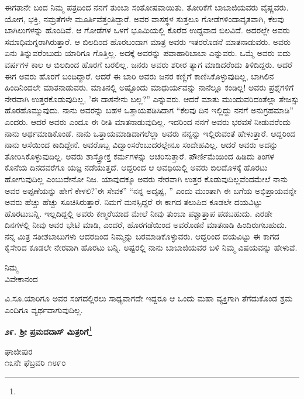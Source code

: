 ಈಗತಾನೇ ಬಂದ ನಿಮ್ಮ ಪತ್ರದಿಂದ ನನಗೆ ತುಂಬಾ ಸಂತೋಷವಾಯಿತು. ತೋರಿಕೆಗೆ ಬಾಬಾಜಿಯವರು ವೈಷ್ಣವರು. ಯೋಗ, ಭಕ್ತಿ, ನಮ್ರತೆಗಳೇ ಮೂರ್ತಿವೆತ್ತಂತಿದ್ದಾರೆ. ಅವರ ವಾಸಸ್ಥಳ ಸುತ್ತಲೂ ಗೋಡೆಗಳಿಂದಾವೃತವಾಗಿ, ಕೆಲವು ಬಾಗಿಲುಗಳನ್ನು ಹೊಂದಿವೆ. ಆ ಗೋಡೆಗಳ ಒಳಗೆ ಭೂಮಿಯಲ್ಲಿ ಕೊರೆದ ಉದ್ದವಾದ ಬಿಲವಿದೆ. ಅದರಲ್ಲೇ ಅವರು ಸಮಾಧಿಮಗ್ನರಾಗಿರುತ್ತಾರೆ. ಆ ಬಿಲದಿಂದ ಹೊರಬಂದಾಗ ಮಾತ್ರ ಅವರು ಇತರರೊಡನೆ ಮಾತನಾಡುವರು. ಅವರು ಏನು ತಿನ್ನುವರೆಂಬುದು ಯಾರಿಗೂ ಗೊತ್ತಿಲ್ಲ. ಅದಕ್ಕೆ ಅವರನ್ನು ಪವಾಹಾರಿಬಾಬಾ ಎನ್ನುವರು. ಒಮ್ಮೆ ಅವರು ಐದು ವರ್ಷಗಳ ಕಾಲ ಆ ಬಿಲದಿಂದ ಹೊರಗೆ ಬರಲಿಲ್ಲ. ಜನರು ಅವರು ಶರೀರ ತ್ಯಾಗ ಮಾಡಿದರೆಂದು ತಿಳಿದಿದ್ದರು. ಆದರೆ ಈಗ ಅವರು ಹೊರಗೆ ಬಂದಿದ್ದಾರೆ. ಆದರೆ ಈ ಬಾರಿ ಅವರು ಜನರ ಕಣ್ಣಿಗೆ ಕಾಣಿಸಿಕೊಳ್ಳುವುದಿಲ್ಲ, ಬಾಗಿಲಿನ ಹಿಂದಿನಿಂದಲೇ ಮಾತನಾಡುವರು. ಮಾತಿನಲ್ಲಿ ಅಷ್ಟೊಂದು ಮಾಧುರ್ಯವನ್ನು ನಾನೆಲ್ಲೂ ಕಂಡಿಲ್ಲ! ಅವರು ಪ್ರಶ್ನೆಗಳಿಗೆ ನೇರವಾಗಿ ಉತ್ತರಕೊಡುವುದಿಲ್ಲ, ’ಈ ದಾಸನೇನು ಬಲ್ಲ?” ಎನ್ನುವರು. ಆದರೆ ಮಾತು ಮುಂದುವರಿದಂತೆಲ್ಲಾ ತೇಜಸ್ಸು ಹೊರಹೊಮ್ಮುವುದು. ನಾನು ಅವರನ್ನು ಬಹಳ ಒತ್ತಾಯಪಡಿಸಿದಾಗ “ಕೆಲವು ದಿನ ಇಲ್ಲಿದ್ದು ನನಗೆ ಅನುಗ್ರಹಮಾಡಿ” ಎಂದರು. ಆದರೆ ಅವರು ಎಂದೂ ಈ ರೀತಿ ಮಾತನಾಡುವುದಿಲ್ಲ. ಇದರಿಂದ ನನಗೆ ಅವರು ಭರವಸೆ ನೀಡುವರೆಂದು ನಾನು ಅರ್ಥಮಾಡಿಕೊಂಡೆ. ನಾನು ಒತ್ತಾಯಮಾಡಿದಾಗಲೆಲ್ಲಾ ಅವರು ನನ್ನನ್ನು ಇಲ್ಲಿರುವಂತೆ ಹೇಳುತ್ತಾರೆ. ಆದ್ದರಿಂದ ನಾನು ಆಸೆಯಿಂದ ಕಾದಿದ್ದೇನೆ. ಅವರೊಬ್ಬ ವಿದ್ವಾಂಸರೆಂಬುದರಲ್ಲೇನೂ ಸಂದೇಹವಿಲ್ಲ. ಆದರೆ ಅವರು ಅದನ್ನು ತೋರಿಸಿಕೊಳ್ಳುವುದಿಲ್ಲ. ಅವರು ಶಾಸ್ತ್ರೋಕ್ತ ಕರ್ಮಗಳನ್ನು ಆಚರಿಸುತ್ತಾರೆ. ಪೌರ್ಣಿಮೆಯಿಂದ ಹಿಡಿದು ತಿಂಗಳ ಕೊನೆಯ ದಿನದವರೆಗೂ ಯಜ್ಞ ನಡೆಯುತ್ತದೆ. ಆದ್ದರಿಂದ ಆ ಅವಧಿಯಲ್ಲಿ ಅವರು ಬಿಲದೊಳಕ್ಕೆ ಹೊರಟು ಹೋಗುವುದಿಲ್ಲ ಎಂಬುದೇನೋ ನಿಜ. ಯಾವುದಕ್ಕೂ ಅವರು ನೇರವಾಗಿ ಉತ್ತರ ಕೊಡುವುದಿಲ್ಲವೆಂದಮೇಲೆ ನಾನು ಅವರ ಅಪ್ಪಣೆಯನ್ನು ಹೇಗೆ ಕೇಳಲಿ?’ಈ ಸೇವಕ” “ನನ್ನ ಅದೃಷ್ಟ, ” ಎಂದು ಮುಂತಾಗಿ ಈ ಬಗೆಯ ಅಭಿಪ್ರಾಯವನ್ನೇ ಅವರು ಹೆಚ್ಚು ಹೆಚ್ಚು ಸೂಚಿಸಿರುತ್ತಾರೆ. ನಿಮಗೆ ಮನಸ್ಸಿದ್ದರೆ ಈ ಕಾಗದ ತಲುಪಿದ ಕೂಡಲೇ ದಯವಿಟ್ಟು ಹೊರಟುಬನ್ನಿ. ಇಲ್ಲದಿದ್ದಲ್ಲಿ ಅವರು ಕಣ್ಮರೆಯಾದ ಮೇಲೆ ನೀವು ತುಂಬಾ ಪಶ್ಚಾತ್ತಾಪ ಪಡಬಹುದು. ಎರಡೇ ದಿನಗಳಲ್ಲಿ ನೀವು ಅವರ ಭೇಟಿ ಮಾಡಿ, ಎಂದರೆ, ಹೊರಗಡೆಯಿಂದ ಅವರೊಡನೆ ಮಾತನಾಡಿ ಹಿಂದಿರುಗಬಹುದು. ನನ್ನ ಮಿತ್ರ ಸತೀಶಬಾಬುಗಳು ಆದರದಿಂದ ನಿಮ್ಮನ್ನು ಬರಮಾಡಿಕೊಳ್ಳುವರು. ಆದ್ದರಿಂದ ದಯವಿಟ್ಟು ಈ ಕಾಗದ ಕೈಸೇರಿದ ಕೂಡಲೇ ನೇರವಾಗಿ ಹೊರಟು ಬನ್ನಿ. ಅಷ್ಟರಲ್ಲಿ ನಾನು ಬಾಬಾಜಿಯವರ ಬಳಿ ನಿಮ್ಮ ವಿಷಯವನ್ನು ಹೇಳುವೆ.
\vspace{-0.1cm}

{\flushright
ನಿಮ್ಮ\\ವಿವೇಕಾನಂದ\par}

ವಿ.ಸೂ.\enginline{-}ಯಾರಿಗೂ ಅವರ ಸಂಗದಲ್ಲಿರಲು ಸಾಧ್ಯವಾಗದೇ ಇದ್ದರೂ ಆ ಒಂದು ಮಹಾ ವ್ಯಕ್ತಿಗಾಗಿ ತೆಗೆದುಕೊಂಡ ಶ್ರಮ ಎಂದಿಗೂ ವ್ಯರ್ಥವಾಗುವುದಿಲ್ಲ.

\begin{center}
\textbf{೨೯. ಶ‍್ರೀ ಪ್ರಮದದಾಸ್ ಮಿತ್ರರಿಗೆ}\footnote{}
\end{center}

\begin{flushright}
ಘಾಜೀಪುರ\\೧೩ನೇ ಫೆಬ್ರವರಿ ೧೮೯೦
\end{flushright}

